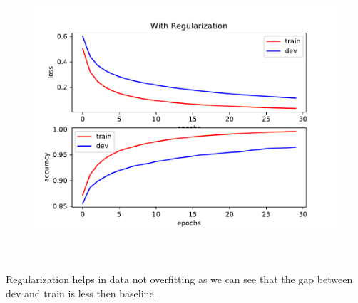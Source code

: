 \begin{answer}
\\ \\ \\ \\ \\ \\ 
\begin{figure}[h!]
  \centering
  \includegraphics[width=.75\linewidth]{mnist/regularized.pdf}
  \label{fig:sub1}
\end{figure}
\\ \\
Regularization helps in data not overfitting as we can see that the gap between dev and train is less then baseline.
\end{answer}
